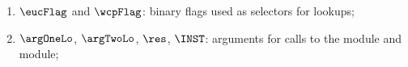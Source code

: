 \begin{enumerate}
	\item $\eucFlag$ and $\wcpFlag$:
		binary flags used as selectors for lookups;
	\item $\argOneLo$, $\argTwoLo$, $\res$, $\INST$:
		arguments for calls to the \wcpMod{} module and \eucMod{} module;
\end{enumerate}
